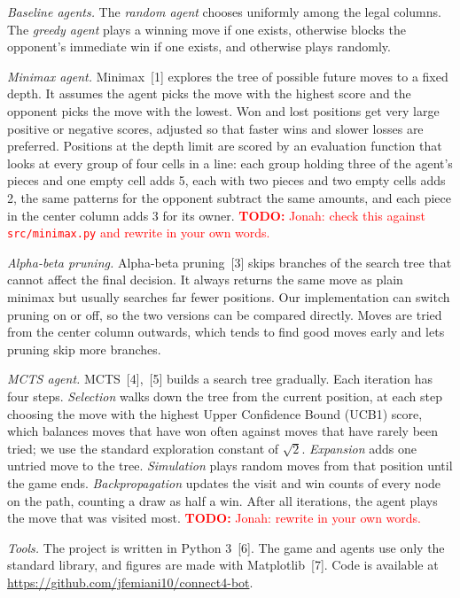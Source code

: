 \documentclass[10pt,twocolumn,letterpaper]{article}
\newcommand{\todo}[1]{\textcolor{red}{\textbf{TODO:} #1}}
\begin{document}
\textit{Baseline agents.} The \emph{random agent} chooses uniformly among the legal
columns. The \emph{greedy agent} plays a winning move if one exists, otherwise blocks the
opponent's immediate win if one exists, and otherwise plays randomly.

\textit{Minimax agent.} Minimax~[1] explores the tree of possible future moves to a fixed
depth. It assumes the agent picks the move with the highest score and the opponent picks the
move with the lowest. Won and lost positions get very large positive or negative scores,
adjusted so that faster wins and slower losses are preferred. Positions at the depth limit
are scored by an evaluation function that looks at every group of four cells in a line: each
group holding three of the agent's pieces and one empty cell adds 5, each with two pieces and
two empty cells adds 2, the same patterns for the opponent subtract the same amounts, and
each piece in the center column adds 3 for its owner. \todo{Jonah: check this against
\texttt{src/minimax.py} and rewrite in your own words.}

\textit{Alpha-beta pruning.} Alpha-beta pruning~[3] skips branches of the search tree that
cannot affect the final decision. It always returns the same move as plain minimax but
usually searches far fewer positions. Our implementation can switch pruning on or off, so
the two versions can be compared directly. Moves are tried from the center column outwards,
which tends to find good moves early and lets pruning skip more branches.

\textit{MCTS agent.} MCTS~[4],~[5] builds a search tree gradually. Each iteration has four
steps. \emph{Selection} walks down the tree from the current position, at each step choosing
the move with the highest Upper Confidence Bound (UCB1) score, which balances moves that have
won often against moves that have rarely been tried; we use the standard exploration
constant of $\sqrt{2}$. \emph{Expansion} adds one untried move to the tree.
\emph{Simulation} plays random moves from that position until the game ends.
\emph{Backpropagation} updates the visit and win counts of every node on the path, counting a
draw as half a win. After all iterations, the agent plays the move that was visited most.
\todo{Jonah: rewrite in your own words.}

\textit{Tools.} The project is written in Python 3~[6]. The game and agents use only the
standard library, and figures are made with Matplotlib~[7]. Code is available at
\url{https://github.com/jfemiani10/connect4-bot}.
\end{document}
